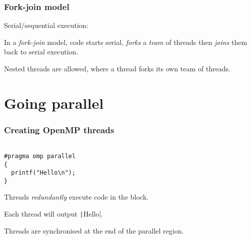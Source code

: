 \documentclass{beamer}
\begin{document}
\begin{frame}
\frametitle{Fork-join model}
Serial/sequential execution:
\begin{center}
\end{center}

\pause

In a \emph{fork-join} model, code starts serial, \emph{forks} a \emph{team} of threads then \emph{joins} them back to serial execution.
\begin{center}
\end{center}

Nested threads are allowed, where a thread forks its own team of threads.
\end{frame}

\section{Going parallel}
\begin{frame}[fragile]
\frametitle{Creating OpenMP threads}
\begin{verbatim}

#pragma omp parallel
{
  printf("Hello\n");
}

\end{verbatim}

Threads \emph{redundantly} execute code in the block.

Each thread will output \texttt|Hello|.

Threads are synchronised at the end of the parallel region.

\end{frame}
\end{document}
